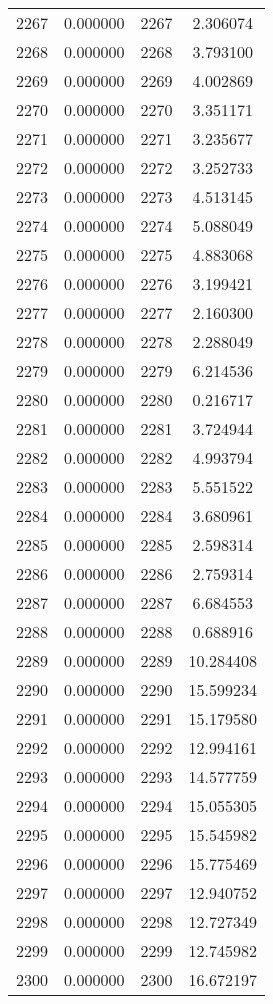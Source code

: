 \documentclass[12pt]{article}
\begin{document}
\begin{longtable}{@{}cccc@{}}
2267 & 0.000000 & 2267 & 2.306074 \\
2268 & 0.000000 & 2268 & 3.793100 \\
2269 & 0.000000 & 2269 & 4.002869 \\
2270 & 0.000000 & 2270 & 3.351171 \\
2271 & 0.000000 & 2271 & 3.235677 \\
2272 & 0.000000 & 2272 & 3.252733 \\
2273 & 0.000000 & 2273 & 4.513145 \\
2274 & 0.000000 & 2274 & 5.088049 \\
2275 & 0.000000 & 2275 & 4.883068 \\
2276 & 0.000000 & 2276 & 3.199421 \\
2277 & 0.000000 & 2277 & 2.160300 \\
2278 & 0.000000 & 2278 & 2.288049 \\
2279 & 0.000000 & 2279 & 6.214536 \\
2280 & 0.000000 & 2280 & 0.216717 \\
2281 & 0.000000 & 2281 & 3.724944 \\
2282 & 0.000000 & 2282 & 4.993794 \\
2283 & 0.000000 & 2283 & 5.551522 \\
2284 & 0.000000 & 2284 & 3.680961 \\
2285 & 0.000000 & 2285 & 2.598314 \\
2286 & 0.000000 & 2286 & 2.759314 \\
2287 & 0.000000 & 2287 & 6.684553 \\
2288 & 0.000000 & 2288 & 0.688916 \\
2289 & 0.000000 & 2289 & 10.284408 \\
2290 & 0.000000 & 2290 & 15.599234 \\
2291 & 0.000000 & 2291 & 15.179580 \\
2292 & 0.000000 & 2292 & 12.994161 \\
2293 & 0.000000 & 2293 & 14.577759 \\
2294 & 0.000000 & 2294 & 15.055305 \\
2295 & 0.000000 & 2295 & 15.545982 \\
2296 & 0.000000 & 2296 & 15.775469 \\
2297 & 0.000000 & 2297 & 12.940752 \\
2298 & 0.000000 & 2298 & 12.727349 \\
2299 & 0.000000 & 2299 & 12.745982 \\
2300 & 0.000000 & 2300 & 16.672197 \\

\end{longtable}
\end{document}
